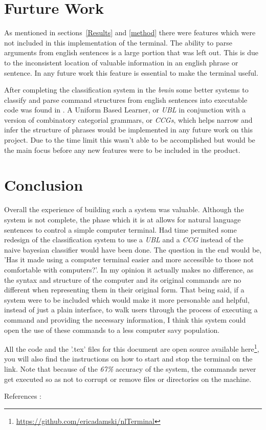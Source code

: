 \documentclass[12pt]{article}
\begin{document}
\section{Furture Work}

As mentioned in sections~\ref{Results} and \ref{method} there were features which were not included in this implementation of the terminal. The ability to parse arguments from english sentences is a large portion that was left out. This is due to the inconsistent location of valuable information in an english phrase or sentence. In any future work this feature is essential to make the terminal useful.

After completing the classification system in the {\it brain} some better systems to classify and parse command structures from english sentences into executable code was found in \cite{matuszek}. A Uniform Based Learner, or {\it UBL} in conjunction with a version of combinatory categorial grammars, or {\it CCGs}, which helps narrow and infer the structure of phrases would be implemented in any future work on this project. Due to the time limit this wasn't able to be accomplished but would be the main focus before any new features were to be included in the product.

\section{Conclusion}

Overall the experience of building such a system was valuable. Although the system is not complete, the phase which it is at allows for natural language sentences to control a simple computer terminal. Had time permited some redesign of the classification system to use a {\it UBL} and a {\it CCG} instead of the naive bayesian classifier would have been done. The question in the end would be, 'Has it made using a computer terminal easier and more accessible to those not comfortable with computers?'. In my opinion it actually makes no difference, as the syntax and structure of the computer and its original commands are no different when representing them in their original form. That being said, if a system were to be included which would make it more personable and helpful, instead of just a plain interface, to walk users through the process of executing a command and providing the necessary information, I think this system could open the use of these commands to a less computer savy population.

All the code and the '.tex' files for this document are open source available here\footnote{\url{https://github.com/ericadamski/nlTerminal}}, you will also find the instructions on how to start and stop the terminal on the link. Note that because of the {\it 67\%} accuracy of the system, the commands never get executed so as not to corrupt or remove files or directories on the machine.

{\tiny References : \cite{enikuomehin}\cite{collobert}\cite{schank}\cite{hahn}\cite{miller}\cite{ravichandran}}



\end{document}
